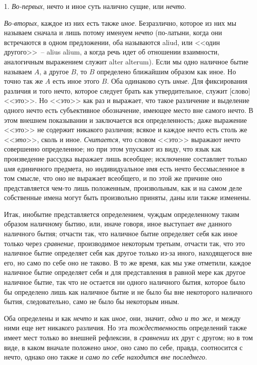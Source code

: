1. \emph{Во-первых}, нечто и иное суть налично сущие, или
\emph{нечто}.

\emph{Во-вторых}, каждое из них есть также \emph{иное}. Безразлично,
которое из них мы называем сначала и лишь потому
именуем \emph{нечто} (по-латыни, когда они встречаются
в одном предложении, оба называются aliud, или <<один
другого>>~-- alius alium, а когда речь идет об отношении
взаимности, аналогичным выражением служит alter alterum).
Если мы одно наличное бытие называем $A$, а другое
$B$, то $B$ определено ближайшим образом как иное.
Но точно так же $A$ есть иное этого $B$. Оба одинаково суть
\emph{иные}. Для фиксирования различия и того нечто, которое
следует брать как утвердительное, служит [слово] <<это>>\endnotemark{}.
Но <<это>> как раз и выражает, что такое различение и выделение
одного нечто есть субъективное обозначение,
имеющее место вне самого нечто. В этом внешнем показывании
и заключается вся определенность; даже выражение
<<это>> не содержит никакого различия; всякое и каждое
нечто есть столь же <<\emph{это}>>, сколь и иное. \emph{Считается}, что
словом <<это>> выражают нечто совершенно определенное;
но при этом упускают из виду, что язык как произведение
рассудка выражает лишь всеобщее; исключение составляет
только \emph{имя} единичного предмета, но индивидуальное
имя есть нечто бессмысленное в том смысле, что оно
не выражает всеобщего, и по этой же причине оно представляется
чем-то лишь положенным, произвольным, как
и на самом деле собственные имена могут быть произвольно
приняты, даны или также изменены.


Итак, инобытие представляется определением, чуждым
определенному таким образом наличному бытию,
или, иначе говоря, иное выступает \emph{вне} данного наличного
бытия; отчасти так, что наличное бытие определяет
себя как иное только через \emph{сравнение}, производимое некоторым
третьим, отчасти так, что это наличное бытие
определяет себя как другое только из-за иного, находящегося
вне его, но само по себе оно не таково. В то же
время, как мы уже отметили, каждое наличное бытие
определяет себя и для представления в равной мере как
другое наличное бытие, так что не остается ни одного
наличного бытия, которое было бы определено лишь как
наличное бытие и не было бы вне некоторого наличного
бытия, следовательно, само не было бы некоторым иным.

Оба определены и как \emph{нечто} и как \emph{иное}, они, значит,
\emph{одно и то же}, и между ними еще нет никакого различия.
Но эта \emph{тождественность} определений также имеет мест
только во внешней рефлексии, в \emph{сравнении} их друг с другом;
но в том виде, в каком вначале положено \emph{иное}, оно
само по себе, правда, соотносится с нечто, однако оно
также и \emph{само по себе находится вне последнего}.

